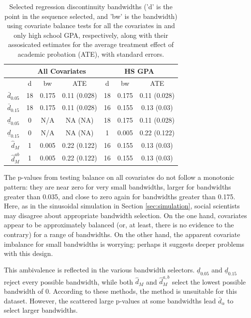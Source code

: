 \documentclass[lineno]{biometrika}\usepackage[]{graphicx}\usepackage[]{color}
\newcommand{\dalphaU}{\bar{d}_\alpha}
\newcommand{\dhat}{\hat{d}}
\newcommand{\dhatB}{\underline{d}}
\newcommand{\dhatm}{\hat{d}_M}
\newcommand{\dhatmab}{\hat{d}^{ab}_M}
\begin{document}
\begin{table}[ht]
\centering
\begin{tabular}{r|ccc|ccc|}
  & \multicolumn{3}{c}{All Covariates}&\multicolumn{3}{c}{HS GPA}\\
 \hline
 & d & bw & ATE & d & bw & ATE \\
  \hline
$\bar{d}_{0.05}$ & 18 & 0.175 & 0.11 (0.028) & 18 & 0.175 & 0.11 (0.028) \\
  $\bar{d}_{0.15}$ & 18 & 0.175 & 0.11 (0.028) & 16 & 0.155 & 0.13 (0.03) \\
  $\underline{d}_{0.05}$ & 0 & N/A & NA (NA) & 18 & 0.175 & 0.11 (0.028) \\
  $\underline{d}_{0.15}$ & 0 & N/A & NA (NA) & 1 & 0.005 & 0.22 (0.122) \\
  $\dhatm$ & 1 & 0.005 & 0.22 (0.122) & 16 & 0.155 & 0.13 (0.03) \\
  $\dhatmab$ & 1 & 0.005 & 0.22 (0.122) & 16 & 0.155 & 0.13 (0.03) \\
   \hline
\end{tabular}
\caption{Selected regression discontinuity bandwidths ('d' is the point in the sequence selected, and 'bw' is the bandwidth) using covariate balance tests for all the covariates in \citet{lso} and only high school GPA, respectively, along with their assosicated estimates for the average treatment effect of academic probation (ATE), with standard errors.}
\label{tab:RDD}
\end{table}


The p-values from testing balance on all covariates do not follow a
monotonic pattern: they are near zero for very small bandwidths,
larger for bandwidths greater than 0.035, and close to zero again for
bandwidths greater than 0.175.
Here, as in the sinusoidal simulation in Section \ref{sec:simulation},
social scientists may disagree about appropriate bandwidth selection.
On the one hand, covariates appear to be approximately balanced (or,
at least, there is no evidence to the contrary) for a range of
bandwidths.
On the other hand, the apparent covariate imbalance for small
bandwidths is worrying: perhaps it suggests deeper problems with this
design.

This ambivalence is reflected in the various bandwidth selectors.
$\dhatB_{0.05}$ and $\dhatB_{0.15}$ reject every possible bandwidth, while
both $\dhatm$ and $\dhat_M^{a,b}$ select the lowest possible
bandwidth of 0.
According to these methods, the \citet{cft} method is unsuitable for this
dataset.
However, the scattered large p-values at some bandwidths lead
 $\dalphaU$ to select larger bandwidths.
\end{document}
